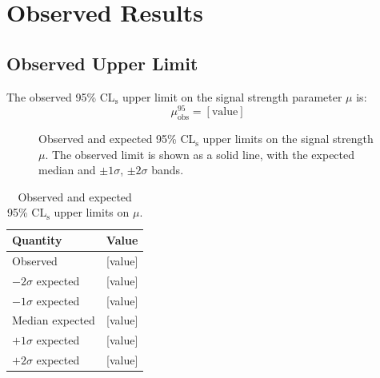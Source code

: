 
\section{Observed Results}
\label{sec:observed}


\subsection{Observed Upper Limit}
\label{sec:observed:limit}


The observed 95\% CL$_\text{s}$ upper limit on the signal strength
parameter $\mu$ is:
\begin{equation}
  \mu_\text{obs}^{95} = [\text{value}]
\end{equation}


\begin{figure}[htbp]
  \centering
  \caption{Observed and expected 95\% CL$_\text{s}$ upper limits on the
           signal strength $\mu$. The observed limit is shown as a solid
           line, with the expected median and $\pm 1\sigma$, $\pm 2\sigma$
           bands.}
  \label{fig:brazil_observed}
\end{figure}

\begin{table}[htbp]
  \centering
  \caption{Observed and expected 95\% CL$_\text{s}$ upper limits on $\mu$.}
  \label{tab:observed_limit}
  \begin{tabular}{lr}
    \toprule
    Quantity & Value \\
    \midrule
    Observed            & [value] \\
    $-2\sigma$ expected & [value] \\
    $-1\sigma$ expected & [value] \\
    Median expected     & [value] \\
    $+1\sigma$ expected & [value] \\
    $+2\sigma$ expected & [value] \\
    \bottomrule
  \end{tabular}
\end{table}

